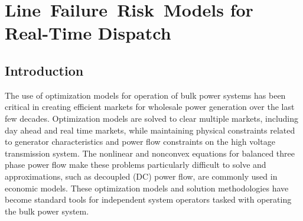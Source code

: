 \newcommand{\mypathjcc}{../thesis/jcc}
\newcommand{\mypathjccdata}{../thesis/jcc/data}

\chapter{Line~Failure~Risk~Models for Real-Time Dispatch}\label{jcc-chapter}

\section{Introduction}

The use of optimization models for operation of bulk power systems has been critical in creating efficient markets for wholesale power generation over the last few decades.  Optimization models are solved to clear multiple markets, including day ahead and real time markets, while maintaining physical constraints related to generator characteristics and power flow constraints on the high voltage transmission system. The nonlinear and nonconvex equations for balanced three phase power flow make these problems particularly difficult to solve and approximations, such as decoupled (DC) power flow, are commonly used in economic models. 
These optimization models and solution methodologies have become standard tools for independent system operators tasked with operating the bulk power system.

